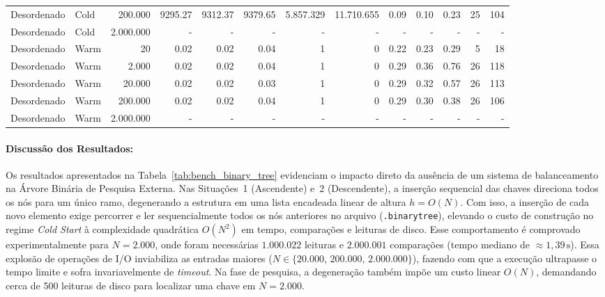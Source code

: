 \documentclass[12pt,a4paper]{article}
\begin{document}
\begin{table}[H]
{\begin{tabular}{llr rrr rr rrr rr}
Desordenado & Cold & 200.000               & 9295.27 & 9312.37 & 9379.65 & 5.857.329 & 11.710.655 &    0.09 &    0.10 &    0.23 &    25 &   104 \\
Desordenado & Cold & 2.000.000 &  - & - & - & - & - & - & - & - & - & - \\ %
\midrule
Desordenado & Warm & 20                                        &    0.02 &    0.02 &    0.04 &     1 &     0 &    0.22 &    0.23 &    0.29 &     5 &    18 \\
Desordenado & Warm & 2.000                         &    0.02 &    0.02 &    0.04 &     1 &     0 &    0.29 &    0.36 &    0.76 &    26 &   118 \\
Desordenado & Warm & 20.000                    &    0.02 &    0.02 &    0.03 &     1 &     0 &    0.29 &    0.32 &    0.57 &    26 &   113 \\
Desordenado & Warm & 200.000               &    0.02 &    0.02 &    0.04 &     1 &     0 &    0.29 &    0.30 &    0.38 &    26 &   106 \\
Desordenado & Warm & 2.000.000 &  - & - & - & - & - & - & - & - & - & - \\ %
\bottomrule
\end{tabular}%
}
\end{table}

\paragraph{Discussão dos Resultados:}
Os resultados apresentados na Tabela~\ref{tab:bench_binary_tree} evidenciam o impacto direto da ausência de um sistema de balanceamento na Árvore Binária de Pesquisa Externa. Nas Situações~1 (Ascendente) e~2 (Descendente), a inserção sequencial das chaves direciona todos os nós para um único ramo, degenerando a estrutura em uma lista encadeada linear de altura $h = O(N)$. Com isso, a inserção de cada novo elemento exige percorrer e ler sequencialmente todos os nós anteriores no arquivo (\texttt{.binarytree}), elevando o custo de construção no regime \textit{Cold Start} à complexidade quadrática $O(N^2)$ em tempo, comparações e leituras de disco. Esse comportamento é comprovado experimentalmente para $N = 2.000$, onde foram necessárias $1.000.022$ leituras e $2.000.001$ comparações (tempo mediano de $\approx 1{,}39\,\text{s}$). Essa explosão de operações de I/O inviabiliza as entradas maiores ($N \in \{20.000, \, 200.000, \, 2.000.000\}$), fazendo com que a execução ultrapasse o tempo limite e sofra invariavelmente de \textit{timeout}. Na fase de pesquisa, a degeneração também impõe um custo linear $O(N)$, demandando cerca de 500 leituras de disco para localizar uma chave em $N = 2.000$.
\end{document}
